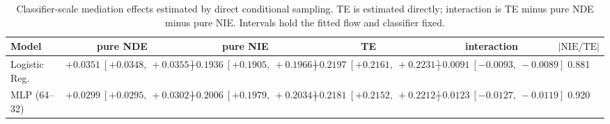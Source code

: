 \begin{table}[htbp]
  \centering
  \caption{Classifier-scale mediation effects estimated by direct conditional sampling. TE is estimated directly; interaction is TE minus pure NDE minus pure NIE. Intervals hold the fitted flow and classifier fixed.}
  \label{tab:german_synth_gap_overall}
  \begin{tabular}{lccccc}
    \toprule
    Model & pure NDE & pure NIE & TE & interaction & $|\mathrm{NIE}/\mathrm{TE}|$ \\
    \midrule
    Logistic Reg. & $+0.0351\ [+0.0348,\ +0.0355]$ & $+0.1936\ [+0.1905,\ +0.1966]$ & $+0.2197\ [+0.2161,\ +0.2231]$ & $-0.0091\ [-0.0093,\ -0.0089]$ & 0.881 \\
    MLP (64--32) & $+0.0299\ [+0.0295,\ +0.0302]$ & $+0.2006\ [+0.1979,\ +0.2034]$ & $+0.2181\ [+0.2152,\ +0.2212]$ & $-0.0123\ [-0.0127,\ -0.0119]$ & 0.920 \\
    \bottomrule
  \end{tabular}
\end{table}